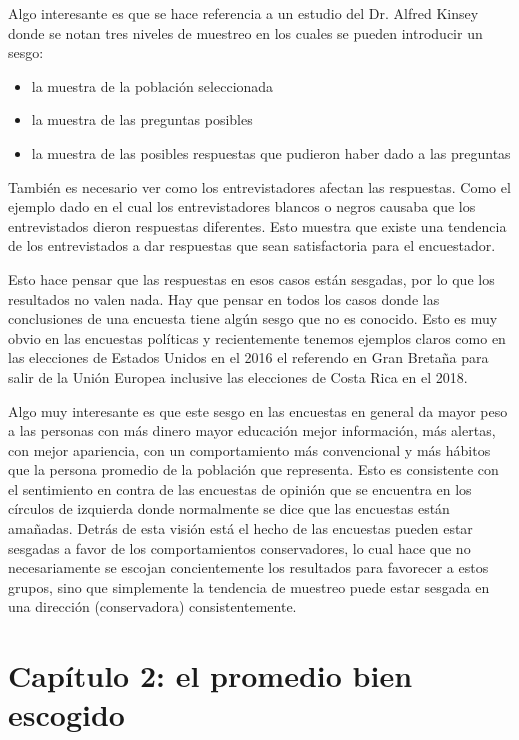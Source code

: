 \documentclass[letterpaper, 11pt]{article}
\begin{document}
 Algo interesante es que se hace referencia a un estudio del Dr. Alfred Kinsey donde se notan tres niveles de muestreo en los cuales se pueden introducir un sesgo:
  
 \begin{itemize}
 	\item la muestra de la población seleccionada
 	\item la muestra de las preguntas posibles
 	\item la muestra de las posibles respuestas que pudieron haber dado a las preguntas
 \end{itemize} 
   
 También es necesario ver como los entrevistadores afectan las respuestas. Como el ejemplo dado en el cual los entrevistadores blancos o negros causaba que los entrevistados dieron respuestas diferentes. Esto muestra que existe una tendencia de los entrevistados a dar respuestas que sean satisfactoria para el encuestador.
 
 Esto hace pensar que las respuestas en esos casos están sesgadas, por lo que los resultados no valen nada. Hay que pensar en todos los casos donde las conclusiones de una encuesta tiene algún sesgo que no es conocido. Esto es muy obvio en las encuestas políticas y recientemente tenemos ejemplos claros como en las elecciones de Estados Unidos en el 2016 el referendo en Gran Bretaña para salir de la Unión Europea inclusive las elecciones de Costa Rica en el 2018.
 
Algo muy interesante es que este sesgo en las encuestas en general da mayor peso a las personas con más dinero mayor educación mejor información, más alertas, con mejor apariencia, con un comportamiento más convencional y más hábitos que la persona promedio de la población que representa. Esto es consistente con el sentimiento en contra de las encuestas de opinión que se encuentra en los círculos de izquierda donde normalmente se dice que las encuestas están amañadas. Detrás de esta visión está el hecho de las encuestas pueden estar sesgadas a favor de los comportamientos conservadores, lo cual hace que no necesariamente se escojan concientemente los resultados para favorecer a estos grupos, sino que  simplemente la tendencia de muestreo puede estar sesgada en una dirección (conservadora) consistentemente.
 
\section*{Capítulo 2: el promedio bien escogido}
\end{document}
